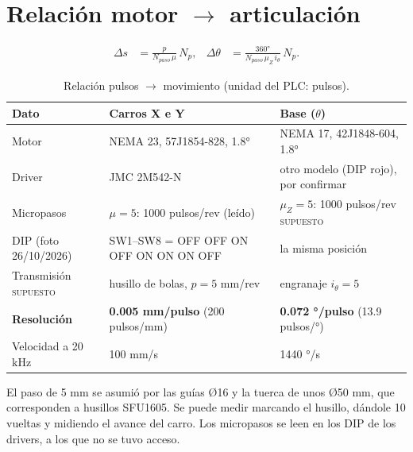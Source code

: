 \documentclass[a4paper,12pt]{article}
\newcommand{\supuesto}{\textcolor{naranja}{\textsc{supuesto}}}
\begin{document}
\section{Relación motor $\rightarrow$ articulación}

\begin{align}
\Delta s &= \frac{p}{N_{paso}\,\mu}\,N_p, &
\Delta\theta &= \frac{360°}{N_{paso}\,\mu_Z\,i_\theta}\,N_p .
\end{align}

\begin{table}[H]
\centering
\begin{tabular}{@{}lll@{}}
\toprule
\textbf{Dato} & \textbf{Carros X e Y} & \textbf{Base ($\theta$)}\\
\midrule
Motor & NEMA 23, 57J1854-828, 1.8° & NEMA 17, 42J1848-604, 1.8°\\
Driver & JMC 2M542-N & otro modelo (DIP rojo), por confirmar\\
Micropasos & $\mu = 5$: 1000 pulsos/rev (leído) & $\mu_Z = 5$: 1000 pulsos/rev \supuesto\\
DIP (foto 26/10/2026) & SW1--SW8 = OFF OFF ON OFF ON ON ON OFF & la misma posición\\
Transmisión \supuesto & husillo de bolas, $p = 5$ mm/rev & engranaje $i_\theta = 5$\\
\textbf{Resolución} & \textbf{0.005 mm/pulso} (200 pulsos/mm) & \textbf{0.072 °/pulso} (13.9 pulsos/°)\\
Velocidad a 20 kHz & 100 mm/s & 1440 °/s\\
\bottomrule
\end{tabular}
\caption{Relación pulsos $\rightarrow$ movimiento (unidad del PLC: pulsos).}
\end{table}

El paso de 5 mm se asumió por las guías Ø16 y la tuerca de unos Ø50 mm, que corresponden a husillos
SFU1605. Se puede medir marcando el husillo, dándole 10 vueltas y midiendo el avance del carro. Los
micropasos se leen en los DIP de los drivers, a los que no se tuvo acceso.
\end{document}
